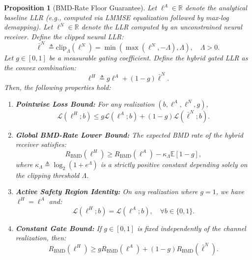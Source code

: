 \documentclass[journal,onecolumn]{IEEEtran}
\newtheorem{proposition}{Proposition}
\begin{document}
\begin{proposition}[BMD-Rate Floor Guarantee]
\label{prop:convex_floor}
Let $\ell^A \in \mathbb{R}$ denote the analytical baseline LLR (e.g., computed via LMMSE equalization followed by max-log demapping). Let $\ell^N \in \mathbb{R}$ denote the LLR computed by an unconstrained neural receiver. Define the clipped neural LLR:
\begin{equation}
\bar{\ell}^N \triangleq \text{clip}_\Lambda (\ell^N) = \min(\max(\ell^N, -\Lambda), \Lambda), \quad \Lambda > 0.
\end{equation}
Let $g \in [0, 1]$ be a measurable gating coefficient. Define the hybrid gated LLR as the convex combination:
\begin{equation}
\ell^H \triangleq g \ell^A + (1 - g) \bar{\ell}^N.
\end{equation}
Then, the following properties hold:
\begin{enumerate}
    \item[(a)] \textbf{Pointwise Loss Bound:} For any realization $(b, \ell^A, \ell^N, g)$,
    \begin{equation}
    \label{eq:pointwise_bound}
    \mathcal{L}(\ell^H; b) \le g \mathcal{L}(\ell^A; b) + (1 - g) \mathcal{L}(\bar{\ell}^N; b).
    \end{equation}
    \item[(b)] \textbf{Global BMD-Rate Lower Bound:} The expected BMD rate of the hybrid receiver satisfies:
    \begin{equation}
    \label{eq:rate_floor}
    R_{\text{BMD}}(\bm{\ell}^H) \ge R_{\text{BMD}}(\bm{\ell}^A) - \kappa_\Lambda \mathbb{E}[1 - g],
    \end{equation}
    where $\kappa_\Lambda \triangleq \log_2(1 + e^\Lambda)$ is a strictly positive constant depending solely on the clipping threshold $\Lambda$.
    \item[(c)] \textbf{Active Safety Region Identity:} On any realization where $g = 1$, we have $\ell^H = \ell^A$ and:
    \begin{equation}
    \mathcal{L}(\ell^H; b) = \mathcal{L}(\ell^A; b), \quad \forall b \in \{0, 1\}.
    \end{equation}
    \item[(d)] \textbf{Constant Gate Bound:} If $g \in [0, 1]$ is fixed independently of the channel realization, then:
    \begin{equation}
    R_{\text{BMD}}(\bm{\ell}^H) \ge g R_{\text{BMD}}(\bm{\ell}^A) + (1 - g) R_{\text{BMD}}(\bar{\bm{\ell}}^N).
    \end{equation}
\end{enumerate}
\end{proposition}
\end{document}
